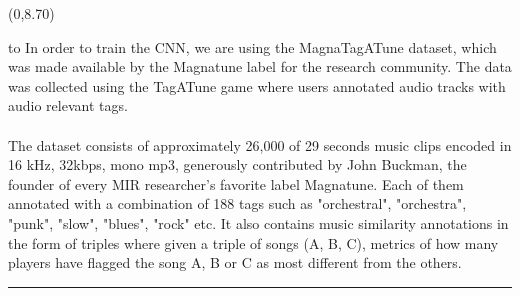 \documentclass[a0]{a0poster}
\def\Head#1{
  \noindent\hbox to \hsize{\hfil{\LARGE\color{DarkBlue}\sf #1}}\bigskip}
\begin{document}
  \begin{textblock}{7}(0,8.70)
    \Head{Dataset}
    \sf
    In order to train the CNN, we are using the MagnaTagATune dataset, which
    was made available by the Magnatune label for the research community. The
    data was collected using the TagATune game where users annotated audio
    tracks with audio relevant tags.
    \\ \\
    The dataset consists of approximately 26,000 of 29 seconds music clips
    encoded in 16 kHz, 32kbps, mono mp3, generously contributed by John
    Buckman, the founder of every MIR researcher's favorite label Magnatune.
    Each of them annotated with a combination of 188 tags such as "orchestral",
    "orchestra", "punk", "slow", "blues", "rock" etc. It also contains music
    similarity annotations in the form of triples where given a triple of songs
    (A, B, C), metrics of how many players have flagged the song A, B or C as
    most different from the others.

    \bigskip
    \hrule
  \end{textblock}
\end{document}
